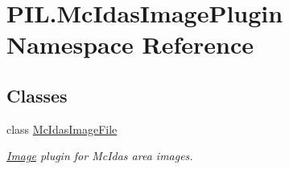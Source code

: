 \hypertarget{namespacePIL_1_1McIdasImagePlugin}{}\section{P\+I\+L.\+Mc\+Idas\+Image\+Plugin Namespace Reference}
\label{namespacePIL_1_1McIdasImagePlugin}
\subsection*{Classes}
\begin{DoxyCompactItemize}
\item 
class \hyperlink{classPIL_1_1McIdasImagePlugin_1_1McIdasImageFile}{Mc\+Idas\+Image\+File}
\begin{DoxyCompactList}\small\item\em \hyperlink{namespacePIL_1_1Image}{Image} plugin for Mc\+Idas area images. \end{DoxyCompactList}\end{DoxyCompactItemize}
